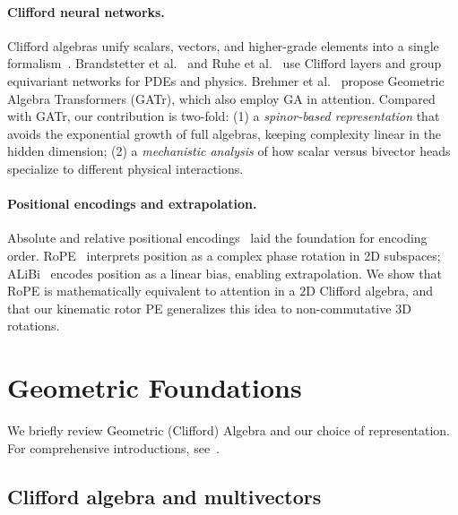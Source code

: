 \documentclass{article}
\theoremstyle{plain}
\theoremstyle{definition}
\theoremstyle{remark}
\begin{document}
\paragraph{Clifford neural networks.}
Clifford algebras unify scalars, vectors, and higher-grade elements into a single formalism~\cite{hestenes1984clifford,lounesto2001clifford}. Brandstetter et al.~\cite{brandstetter2023clifford} and Ruhe et al.~\cite{ruhe2024clifford} use Clifford layers and group equivariant networks for PDEs and physics. Brehmer et al.~\cite{brehmer2023geometric} propose Geometric Algebra Transformers (GATr), which also employ GA in attention. Compared with GATr, our contribution is two-fold: (1) a \emph{spinor-based representation} that avoids the exponential growth of full algebras, keeping complexity linear in the hidden dimension; (2) a \emph{mechanistic analysis} of how scalar versus bivector heads specialize to different physical interactions.

\paragraph{Positional encodings and extrapolation.}
Absolute and relative positional encodings~\cite{vaswani2017attention,shaw2018self} laid the foundation for encoding order. RoPE~\cite{su2024roformer} interprets position as a complex phase rotation in 2D subspaces; ALiBi~\cite{press2022train} encodes position as a linear bias, enabling extrapolation. We show that RoPE is mathematically equivalent to attention in a $2$D Clifford algebra, and that our kinematic rotor PE generalizes this idea to non-commutative 3D rotations.

\section{Geometric Foundations}
\label{sec:preliminaries}

We briefly review Geometric (Clifford) Algebra and our choice of representation. For comprehensive introductions, see~\citet{hestenes1984clifford,lounesto2001clifford,chisolm2012geometric}.

\subsection{Clifford algebra and multivectors}
\end{document}
